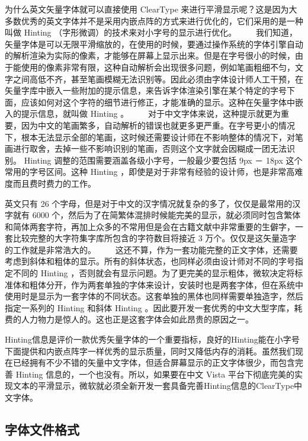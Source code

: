 为什么英文矢量字体就可以直接使用 ClearType 来进行平滑显示呢？这是因为大多数优秀的英文字体并不是采用内嵌点阵的方式来进行优化的，它们采用的是一种叫做 Hinting （字形微调）的技术来对小字号的显示进行优化。
　　我们知道，矢量字体是可以无限平滑缩放的，在使用的时候，要通过操作系统的字体引擎自动的解析渲染为实际的像素，才能够在屏幕上显示出来。但是在字号很小的时候，由于能使用的像素非常有限，这种自动解析会出现很多问题，例如笔画粗细不匀，文字之间高低不齐，甚至笔画模糊无法识别等。因此必须由字体设计师人工干预，在矢量字库中嵌入一些附加的提示信息，来告诉字体渲染引擎在某个特定的字号下面，应该如何对这个字符的细节进行修正，才能准确的显示。这种在矢量字体中嵌入的提示信息，就叫做 Hinting 。
　　对于中文字体来说，这种提示就更为重要，因为中文的笔画繁多，自动解析的错误也就更多更严重。在字号更小的情况下，根本无法显示全部的笔画，这时候还需要设计师在不影响整体的情况下，对笔画进行取舍，去掉一些不影响识别的笔画，否则这个文字就会因糊成一团无法识别。 Hinting 调整的范围需要涵盖各级小字号，一般最少要包括 9px － 18px 这个常用的字号区间。这种 Hinting ，即使是对于非常有经验的设计师，也是非常高难度而且费时费力的工作。

英文只有 26 个字母，但是对于中文的汉字情况就复杂的多了，仅仅是最常用的汉字就有 6000 个，然后为了在简繁体混排时候能完美的显示，就必须同时包含繁体和简体两套字符，再加上众多的不常用但是会在古籍文献中非常重要的生僻字，一套比较完整的大字符集字库所包含的字符数目将接近 3 万个。仅仅是这矢量造字的工作就是非常浩大的。
　　这还不算，作为一套功能完整的正文字体，还需要考虑到斜体和粗体的显示。所有的斜体状态，也同样必须由设计师对不同的字号指定不同的 Hinting ，否则就会有显示问题。为了更完美的显示粗体，微软决定将标准体和粗体分开，作为两套单独的字体来设计，安装时也是两套字体，但在系统中使用时是显示为一套字体的不同状态。这套单独的黑体也同样需要单独造字，然后指定一系列的 Hinting 和斜体 Hinting 。因此要开发一套优秀的中文大型字库，耗费的人力物力是惊人的。这也正是这套字体会如此昂贵的原因之一。

Hinting信息是评价一款优秀矢量字体的一个重要指标，良好的Hinting能在小字号下面提供和内嵌点阵字一样优秀的显示质量，同时又降低内存的消耗。虽然我们现在已经拥有不少不错的矢量中文字体，但适合屏幕显示的正文字体很少，而包含完善 Hinting 信息的，一个也没有。所以，如果要在中文 Vista 平台下彻底完美的实现文本的平滑显示，微软就必须全新开发一套具备完善Hinting信息的ClearType中文字体。

\subsection{字体文件格式}


